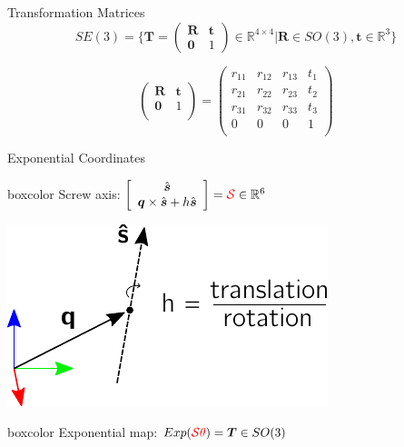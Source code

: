 \documentclass[14pt]{beamer}
\begin{document}
\begin{frame}{Transformation Matrices}
\[
SE(3) = \biggl\{ \boldsymbol{T} = \left(
\begin{array}{cc}
\boldsymbol{R} & \boldsymbol{t}\\
\boldsymbol{0} & 1
\end{array}
\right) \in \mathbb{R}^{4 \times 4}
| \boldsymbol{R} \in SO(3), \boldsymbol{t} \in \mathbb{R}^3 \biggr\}
\]

\[
\left( \begin{array}{cc}
    \boldsymbol R & \boldsymbol t\\
    \boldsymbol 0 & 1\\
\end{array} \right)
=
\left(
\begin{matrix}
r_{11} & r_{12} & r_{13} & t_1\\
r_{21} & r_{22} & r_{23} & t_2\\
r_{31} & r_{32} & r_{33} & t_3\\
0 & 0 & 0 & 1\\
\end{matrix}
\right)
\]
\end{frame}

\begin{frame}{Exponential Coordinates}
\begin{beamercolorbox}[wd=\textwidth,sep=1em]{boxcolor}
Screw axis: $\left[ \begin{array}{c}\hat{\boldsymbol{s}} \\ \boldsymbol{q} \times \hat{\boldsymbol{s}} + h \hat{\boldsymbol{s}}\end{array} \right] = \textcolor{red}{\mathcal{S}} \in \mathbb{R}^6$
\end{beamercolorbox}

\vfill

\hfill\includegraphics{images/screw_axis}

\vfill

\begin{beamercolorbox}[wd=\textwidth,sep=1em]{boxcolor}
Exponential map: $Exp(\textcolor{red}{\mathcal{S}\theta}) = \boldsymbol{T}
\in SO(3)$
\end{beamercolorbox}

\parencite{Lynch2017}
\end{frame}
\end{document}
